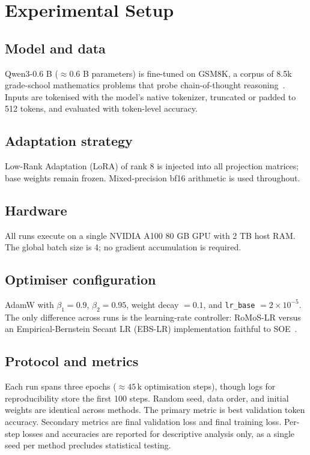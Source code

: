 \documentclass{article} %
\begin{document}
\section{Experimental Setup}\label{sec:experimental}
\subsection{Model and data}
Qwen3-0.6 B (\(\approx 0.6\) B parameters) is fine-tuned on GSM8K, a corpus of 8.5k grade-school mathematics problems that probe chain-of-thought reasoning~\cite{author-year-careful}. Inputs are tokenised with the model's native tokenizer, truncated or padded to 512 tokens, and evaluated with token-level accuracy.

\subsection{Adaptation strategy}
Low-Rank Adaptation (LoRA) of rank 8 is injected into all projection matrices; base weights remain frozen. Mixed-precision bf16 arithmetic is used throughout.

\subsection{Hardware}
All runs execute on a single NVIDIA A100 80 GB GPU with 2 TB host RAM. The global batch size is 4; no gradient accumulation is required.

\subsection{Optimiser configuration}
AdamW with \(\beta_{1} = 0.9\), \(\beta_{2} = 0.95\), weight decay \(= 0.1\), and \texttt{lr\_base} \(= 2 \times 10^{-5}\). The only difference across runs is the learning-rate controller: RoMoS-LR versus an Empirical-Bernstein Secant LR (EBS-LR) implementation faithful to SOE~\cite{author-year-stepping}.

\subsection{Protocol and metrics}
Each run spans three epochs (\(\approx 45\,\mathrm{k}\) optimisation steps), though logs for reproducibility store the first 100 steps. Random seed, data order, and initial weights are identical across methods. The primary metric is best validation token accuracy. Secondary metrics are final validation loss and final training loss. Per-step losses and accuracies are reported for descriptive analysis only, as a single seed per method precludes statistical testing.
\end{document}
